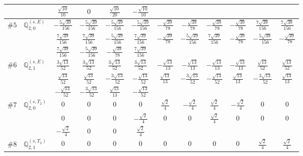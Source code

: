 \documentclass[fleqn,9pt,landscape]{jsarticle}
\begin{document}
\begin{center}
\begin{longtable}{lcccccccccc}
& $ \frac{\sqrt{10}}{10} $ & $ 0 $ & $ \frac{\sqrt{10}}{20} $ & $ - \frac{\sqrt{10}}{10} $ & $  $ & $  $ & $  $ & $  $ & $  $ & $  $ \\ \hline
$ \#5\quad \mathbb{Q}_{2,0}^{(s,E)} $ & $ - \frac{5 \sqrt{39}}{156} $ & $ - \frac{5 \sqrt{39}}{156} $ & $ - \frac{5 \sqrt{39}}{156} $ & $ - \frac{5 \sqrt{39}}{156} $ & $ - \frac{\sqrt{39}}{78} $ & $ - \frac{\sqrt{39}}{78} $ & $ - \frac{\sqrt{39}}{78} $ & $ - \frac{\sqrt{39}}{78} $ & $ \frac{7 \sqrt{39}}{156} $ & $ \frac{7 \sqrt{39}}{156} $ \\
& $ \frac{7 \sqrt{39}}{156} $ & $ \frac{7 \sqrt{39}}{156} $ & $ - \frac{5 \sqrt{39}}{156} $ & $ \frac{7 \sqrt{39}}{156} $ & $ - \frac{\sqrt{39}}{78} $ & $ - \frac{5 \sqrt{39}}{156} $ & $ \frac{7 \sqrt{39}}{156} $ & $ - \frac{\sqrt{39}}{78} $ & $ - \frac{5 \sqrt{39}}{156} $ & $ - \frac{\sqrt{39}}{78} $ \\
& $ \frac{7 \sqrt{39}}{156} $ & $ - \frac{5 \sqrt{39}}{156} $ & $ - \frac{\sqrt{39}}{78} $ & $ \frac{7 \sqrt{39}}{156} $ & $  $ & $  $ & $  $ & $  $ & $  $ & $  $ \\ \hline
$ \#6\quad \mathbb{Q}_{2,1}^{(s,E)} $ & $ \frac{3 \sqrt{13}}{52} $ & $ \frac{3 \sqrt{13}}{52} $ & $ \frac{3 \sqrt{13}}{52} $ & $ \frac{3 \sqrt{13}}{52} $ & $ - \frac{\sqrt{13}}{13} $ & $ - \frac{\sqrt{13}}{13} $ & $ - \frac{\sqrt{13}}{13} $ & $ - \frac{\sqrt{13}}{13} $ & $ \frac{\sqrt{13}}{52} $ & $ \frac{\sqrt{13}}{52} $ \\
& $ \frac{\sqrt{13}}{52} $ & $ \frac{\sqrt{13}}{52} $ & $ - \frac{3 \sqrt{13}}{52} $ & $ - \frac{\sqrt{13}}{52} $ & $ \frac{\sqrt{13}}{13} $ & $ - \frac{3 \sqrt{13}}{52} $ & $ - \frac{\sqrt{13}}{52} $ & $ \frac{\sqrt{13}}{13} $ & $ - \frac{3 \sqrt{13}}{52} $ & $ \frac{\sqrt{13}}{13} $ \\
& $ - \frac{\sqrt{13}}{52} $ & $ - \frac{3 \sqrt{13}}{52} $ & $ \frac{\sqrt{13}}{13} $ & $ - \frac{\sqrt{13}}{52} $ & $  $ & $  $ & $  $ & $  $ & $  $ & $  $ \\ \hline
$ \#7\quad \mathbb{Q}_{2,0}^{(s,T_{2})} $ & $ 0 $ & $ 0 $ & $ 0 $ & $ 0 $ & $ \frac{\sqrt{2}}{4} $ & $ - \frac{\sqrt{2}}{4} $ & $ \frac{\sqrt{2}}{4} $ & $ - \frac{\sqrt{2}}{4} $ & $ 0 $ & $ 0 $ \\
& $ 0 $ & $ 0 $ & $ 0 $ & $ - \frac{\sqrt{2}}{4} $ & $ 0 $ & $ 0 $ & $ \frac{\sqrt{2}}{4} $ & $ 0 $ & $ 0 $ & $ 0 $ \\
& $ - \frac{\sqrt{2}}{4} $ & $ 0 $ & $ 0 $ & $ \frac{\sqrt{2}}{4} $ & $  $ & $  $ & $  $ & $  $ & $  $ & $  $ \\ \hline
$ \#8\quad \mathbb{Q}_{2,1}^{(s,T_{2})} $ & $ 0 $ & $ 0 $ & $ 0 $ & $ 0 $ & $ 0 $ & $ 0 $ & $ 0 $ & $ 0 $ & $ \frac{\sqrt{2}}{4} $ & $ \frac{\sqrt{2}}{4} $ \\

\end{longtable}
\end{center}
\end{document}
